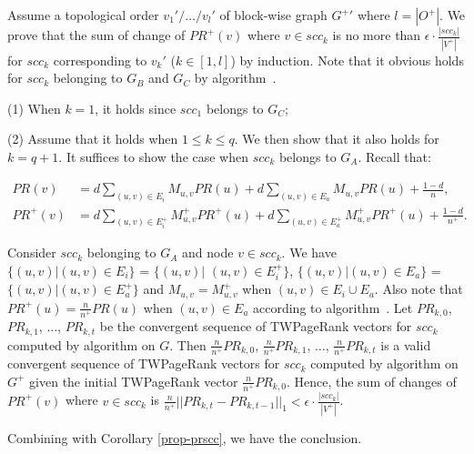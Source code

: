 \vspace{.5ex}
\begin{proofS}
Assume a topological order $v_1'/\dots/v_{l}'$ of block-wise graph $G^+{'}$ where $l=|O^+|$. We prove that the sum of change of $PR^+(v)$ where $v\in scc_k$ is no more than $\epsilon\cdot\frac{|scc_k|}{|V^+|}$ for $scc_k$ corresponding to $v_k'$ ($k\in [1,l]$) by induction. Note that it obvious holds for $scc_k$ belonging to $G_B$ and $G_C$ by algorithm~\inctwprscc.

\noindent(1) When $k=1$, it holds since $scc_1$ belongs to $G_C$;

\noindent(2) Assume that it holds when $1\le k\le q$. We then show that it also holds for $k=q+1$. It suffices to show the case when $scc_k$ belongs to $G_A$. Recall that:

\vspace{-1ex}
\begin{scriptsize}
\begin{equation*}
\begin{split}
PR(v) & =  d \sum_{(u,v)\in E_i} M_{u,v} PR(u) + d \sum_{(u,v)\in E_a} M_{u,v} PR(u) +  \frac{1-d}{n},\\
PR^+(v) & =  d \sum_{(u,v)\in E^+_i} M^+_{u,v} PR^+(u) + d \sum_{(u,v)\in E^+_a} M^+_{u,v} PR^+(u) +  \frac{1-d}{n^+}.
\end{split}
\end{equation*}
\end{scriptsize}
\noindent
Consider $scc_k$ belonging to $G_A$ and node $v\in scc_k$. We have $\{(u,v)|(u,v)\in E_i\}$ = $\{(u,v)|$ $(u,v)\in E^+_i\}$, $\{(u,v)|(u,v)\in E_a\}$ = $\{(u,v)|(u,v)\in E^+_a\}$ and $M_{u,v}=M^+_{u,v}$ when $(u,v)\in E_i\cup E_a$. Also note that $PR^+(u)=\frac{n}{n^+}PR(u)$ when $(u,v)\in E_a$ according to algorithm~\inctwprscc. Let $PR_{k,0}$, $PR_{k,1}$, $\dots$, $PR_{k,t}$ be the convergent sequence of TWPageRank vectors for $scc_k$ computed by algorithm \twprscc on $G$. Then $\frac{n}{n^+}PR_{k,0}$, $\frac{n}{n^+}PR_{k,1}$, $\dots$, $\frac{n}{n^+}PR_{k,t}$ is a valid convergent sequence of TWPageRank vectors for $scc_k$ computed by algorithm \inctwprscc on $G^+$ given the initial TWPageRank vector $\frac{n}{n^+}PR_{k,0}$.
Hence, the sum of changes of $PR^+(v)$ where $v\in scc_k$ is $\frac{n}{n^+}||PR_{k,t}-PR_{k,t-1}||_1 < \epsilon\cdot\frac{|scc_k|}{|V^+|}$.

Combining with Corollary \ref{prop-prscc}, we have the conclusion.
\end{proofS}






